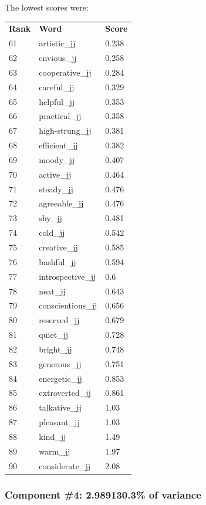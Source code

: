 \documentclass[10pt,letterpaper]{book}
\begin{document}
The lowest scores were:
\begin{tabular}{ l l l }
        \textbf{Rank} & \textbf{Word} & \textbf{Score} \\
        61 & artistic\_jj & 0.238 \\
        62 & envious\_jj & 0.258 \\
        63 & cooperative\_jj & 0.284 \\
        64 & careful\_jj & 0.329 \\
        65 & helpful\_jj & 0.353 \\
        66 & practical\_jj & 0.358 \\
        67 & high-strung\_jj & 0.381 \\
        68 & efficient\_jj & 0.382 \\
        69 & moody\_jj & 0.407 \\
        70 & active\_jj & 0.464 \\
        71 & steady\_jj & 0.476 \\
        72 & agreeable\_jj & 0.476 \\
        73 & shy\_jj & 0.481 \\
        74 & cold\_jj & 0.542 \\
        75 & creative\_jj & 0.585 \\
        76 & bashful\_jj & 0.594 \\
        77 & introspective\_jj & 0.6 \\
        78 & neat\_jj & 0.643 \\
        79 & conscientious\_jj & 0.656 \\
        80 & reserved\_jj & 0.679 \\
        81 & quiet\_jj & 0.728 \\
        82 & bright\_jj & 0.748 \\
        83 & generous\_jj & 0.751 \\
        84 & energetic\_jj & 0.853 \\
        85 & extroverted\_jj & 0.861 \\
        86 & talkative\_jj & 1.03 \\
        87 & pleasant\_jj & 1.03 \\
        88 & kind\_jj & 1.49 \\
        89 & warm\_jj & 1.97 \\
        90 & considerate\_jj & 2.08 \\
\end{tabular}
\subsubsection{Component \#4: 2.989130.3\% of variance}
\end{document}
